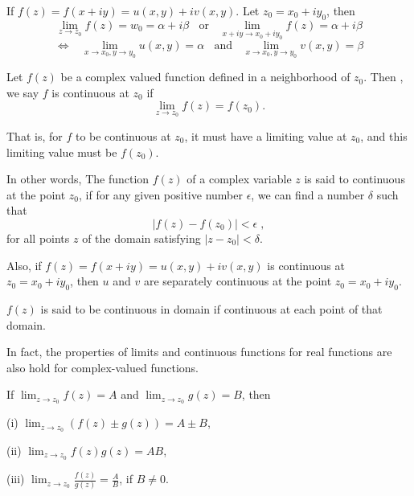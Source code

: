 If $f(z) = f(x+iy) = u(x,y) + iv(x,y)$. Let $z_0=x_0 + i y_0$, then
\[\lim_{z \rightarrow z_0}f(z) = w_0 = \alpha + i \beta\;\;\text{ or }\;\;\lim_{x+iy \rightarrow x_0+iy_0}f(z) =  \alpha + i \beta\]
\[\Leftrightarrow \;\;\; \lim_{x \rightarrow x_0, y \rightarrow y_0} u(x,y) = \alpha \;\;\text{ and }\;\; \lim_{x \rightarrow x_0, y \rightarrow y_0} v(x,y) = \beta\]


\begin{definition}[Continuous]
\label{def:cont}
Let $f(z)$ be a complex valued function defined in a neighborhood of $z_0$.  Then , we say $f$ is continuous at $z_0$ if $$\lim_{z \to z_0} f(z)=f(z_0).$$
\end{definition}
That is,  for $f$ to be continuous at $z_0$, it must have a limiting value at $z_0$, and this limiting value must be $f(z_0)$.

In other words, The function $f(z)$ of a complex variable $z$ is said to continuous at the point $z_0$, if for any given positive number $\epsilon$, we can find a number $\delta$ such that 
\[|f(z)-f(z_0)|<\epsilon \;, \]
for all points $z$ of the domain satisfying $|z-z_0|<\delta$.

Also, if $f(z) = f(x+iy) = u(x,y) + iv(x,y)$  is continuous at $z_0=x_0 + i y_0$, then $u$ and $v$ are separately continuous at the point $z_0 = x_0+iy_0$.
\begin{definition}
$f(z)$ is said to be continuous in domain if continuous at each point of that domain.
\end{definition}

 In fact, the properties of limits and continuous functions  for real functions are also hold for complex-valued functions.  
\begin{theorem}
If $\lim_{z \to z_0} f(z) = A$ and $\lim_{z \to z_0} g(z) = B$, then

\medskip

(i) $\lim_{z \to z_0} (f(z)\pm g(z)) = A \pm B$,

\medskip

(ii) $\lim_{z \to z_0} f(z)g(z) = AB$,

\medskip

(iii) $\lim_{z \to z_0} \frac{f(z)}{g(z)} = \frac{A}{B}$, if $B \neq 0$.
\end{theorem}

